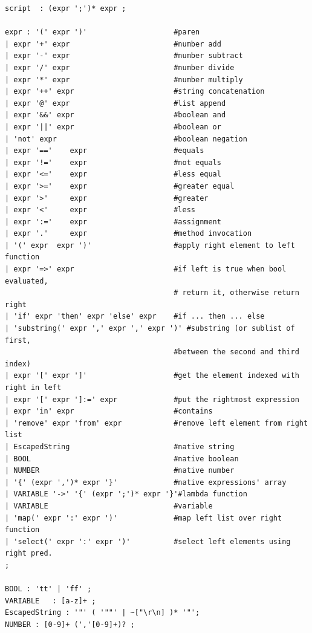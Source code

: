 \begin{lstfloat}[!p]
\begin{lstlisting}[language=antlr,caption=Subset of the \texttt{script} language in Antlr4.,label=def:script,basicstyle=\ttfamily\footnotesize]
script  : (expr ';')* expr ;

expr : '(' expr ')'                    #paren
| expr '+' expr                        #number add
| expr '-' expr                        #number subtract
| expr '/' expr                        #number divide
| expr '*' expr                        #number multiply
| expr '++' expr                       #string concatenation
| expr '@' expr                        #list append
| expr '&&' expr                       #boolean and
| expr '||' expr                       #boolean or
| 'not' expr                           #boolean negation
| expr '=='    expr                    #equals
| expr '!='    expr                    #not equals
| expr '<='    expr                    #less equal
| expr '>='    expr                    #greater equal
| expr '>'     expr                    #greater
| expr '<'     expr                    #less
| expr ':='    expr                    #assignment
| expr '.'     expr                    #method invocation
| '(' expr  expr ')'                   #apply right element to left function
| expr '=>' expr                       #if left is true when bool evaluated, 
                                       # return it, otherwise return right
| 'if' expr 'then' expr 'else' expr    #if ... then ... else
| 'substring(' expr ',' expr ',' expr ')' #substring (or sublist of first, 
                                       #between the second and third index)
| expr '[' expr ']'                    #get the element indexed with right in left
| expr '[' expr ']:=' expr             #put the rightmost expression
| expr 'in' expr                       #contains
| 'remove' expr 'from' expr            #remove left element from right list
| EscapedString                        #native string
| BOOL                                 #native boolean
| NUMBER                               #native number
| '{' (expr ',')* expr '}'             #native expressions' array
| VARIABLE '->' '{' (expr ';')* expr '}'#lambda function
| VARIABLE                             #variable
| 'map(' expr ':' expr ')'             #map left list over right function
| 'select(' expr ':' expr ')'          #select left elements using right pred.
;

BOOL : 'tt' | 'ff' ;
VARIABLE   : [a-z]+ ;
EscapedString : '"' ( '""' | ~["\r\n] )* '"';
NUMBER : [0-9]+ (','[0-9]+)? ;
\end{lstlisting}
\end{lstfloat}

